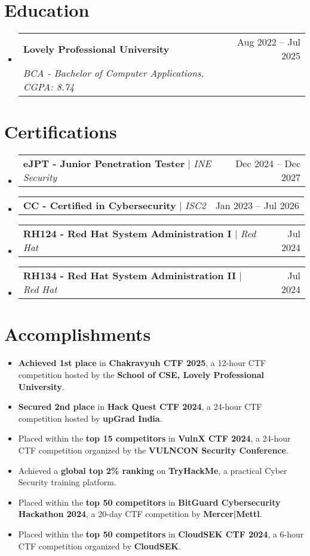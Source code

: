 \documentclass[letterpaper,12pt]{article}
\newcommand{\resumeItem}[1]{
  \item[--]\small{#1} %
}
\newcommand{\resumeSubheading}[4]{
  \item \vspace{1pt}
    \begin{tabularx}{\textwidth}{Xr}
      \textbf{#1} & #2 \\
      \textit{\small#3} & \textit{\small #4} \\
    \end{tabularx} \vspace{1pt}
}
\newcommand{\resumeCertHeading}[2]{
    \item
    \begin{tabularx}{\textwidth}{Xr}
      \small#1 & #2 \\
    \end{tabularx}
}
\newcommand{\resumeItemListStart}{\begin{itemize}[topsep=1pt, itemsep=1pt, leftmargin=0.2in]}
\newcommand{\resumeItemListEnd}{\end{itemize} \vspace{1pt}}
\newcommand{\resumeSubHeadingListStart}{\begin{itemize}[leftmargin=0.15in, label={}, topsep=2pt]}
\newcommand{\resumeSubHeadingListEnd}{\end{itemize}}
\begin{document}

\section{Education}
  \resumeSubHeadingListStart
    \resumeSubheading
      {Lovely Professional University}{Aug 2022 -- Jul 2025}
      {BCA - Bachelor of Computer Applications, CGPA: 8.74}{}
  \resumeSubHeadingListEnd


\section{Certifications}
  \resumeSubHeadingListStart
    \resumeCertHeading
      {\textbf{eJPT - Junior Penetration Tester} $|$ \emph{INE Security}}{Dec 2024 -- Dec 2027}
    \resumeCertHeading
      {\textbf{CC - Certified in Cybersecurity} $|$ \emph{ISC2}}{Jan 2023 -- Jul 2026}
    \resumeCertHeading
      {\textbf{RH124 - Red Hat System Administration I} $|$ \emph{Red Hat}}{Jul 2024}
    \resumeCertHeading
      {\textbf{RH134 - Red Hat System Administration II} $|$ \emph{Red Hat}}{Jul 2024}
  \resumeSubHeadingListEnd


\section{Accomplishments}
\resumeItemListStart
    \resumeItem{\textbf{Achieved 1st place} in \textbf{Chakravyuh CTF 2025}, a 12-hour CTF competition hosted by the \textbf{School of CSE, Lovely Professional University}.}
    \resumeItem{\textbf{Secured 2nd place} in \textbf{Hack Quest CTF 2024}, a 24-hour CTF competition hosted by \textbf{upGrad India}.}
    \resumeItem{Placed within the \textbf{top 15 competitors} in \textbf{VulnX CTF 2024}, a 24-hour CTF competition organized by the \textbf{VULNCON Security Conference}.}
    \resumeItem{Achieved a \textbf{global top 2\% ranking} on \textbf{TryHackMe}, a practical Cyber Security training platform.}
    \resumeItem{Placed within the \textbf{top 50 competitors} in \textbf{BitGuard Cybersecurity Hackathon 2024}, a 20-day CTF competition by \textbf{Mercer|Mettl}.}
    \resumeItem{Placed within the \textbf{top 50 competitors} in \textbf{CloudSEK CTF 2024}, a 6-hour CTF competition organized by \textbf{CloudSEK}.}
\resumeItemListEnd
\end{document}

